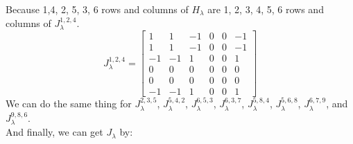 \documentclass{article}
\begin{document}
Because 1,4, 2, 5, 3, 6 rows and columns of $H_{\lambda}$ are 1, 2, 3, 4, 5, 6 rows and columns of $J^{1,2,4}_{\lambda}$.\\
\begin{equation}
  J_\lambda^{1,2,4}=\left[\begin{array}{rr|rr|rr}
  1 & 1 & -1 & 0 & 0 & -1 \\
  1 & 1 & -1 & 0 & 0 & -1 \\
  \hline-1 & -1 & 1 & 0 & 0 & 1 \\
  0 & 0 & 0 & 0 & 0 & 0 \\
  \hline 0 & 0 & 0 & 0 & 0 & 0 \\
  -1 & -1 & 1 & 0 & 0 & 1
  \end{array}\right]
  \end{equation}
We can do the same thing for $J^{2,3,5}_{\lambda}$, $J^{5,4,2}_{\lambda}$, $J^{6,5,3}_{\lambda}$, $J^{6,3,7}_{\lambda}$, $J^{5,8,4}_{\lambda}$, $J^{5,6,8}_{\lambda}$, $J^{6,7,9}_{\lambda}$, and $J^{9,8,6}_{\lambda}$.\\
And finally, we can get $J_{\lambda}$ by:
\end{document}

